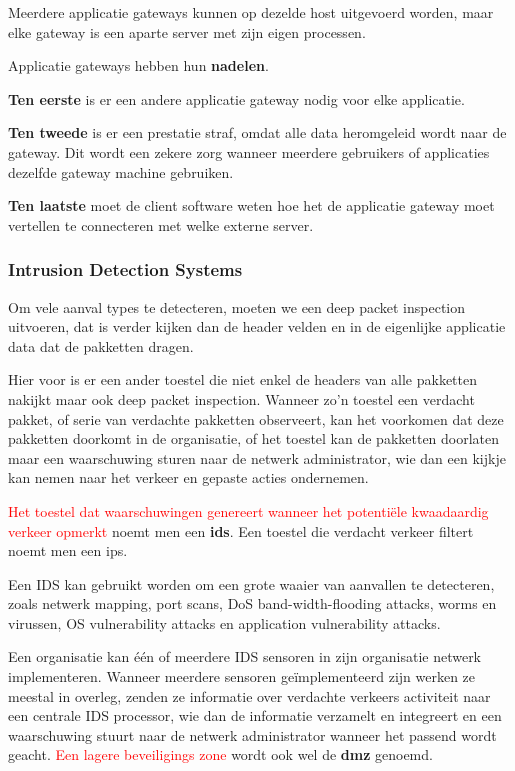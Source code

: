 \noindent Meerdere applicatie gateways kunnen op dezelde host uitgevoerd worden, maar elke gateway is een aparte server met zijn eigen processen.

\noindent Applicatie gateways hebben hun \textbf{nadelen}.

\noindent \textbf{Ten eerste} is er een andere applicatie gateway nodig voor elke applicatie. 

\noindent \textbf{Ten tweede} is er een prestatie straf, omdat alle data heromgeleid wordt naar de gateway. Dit wordt een zekere zorg wanneer meerdere gebruikers of applicaties dezelfde gateway machine gebruiken. 

\noindent \textbf{Ten laatste} moet de client software weten hoe het de applicatie gateway moet vertellen te connecteren met welke externe server.

\newpage

\subsubsection{Intrusion Detection Systems}

\noindent Om vele aanval types te detecteren, moeten we een deep packet inspection uitvoeren, dat is verder kijken dan de header velden en in de eigenlijke applicatie data dat de pakketten dragen.

\noindent Hier voor is er een ander toestel die niet enkel de headers van alle pakketten nakijkt maar ook deep packet inspection. Wanneer zo’n toestel een verdacht pakket, of serie van verdachte pakketten observeert, kan het voorkomen dat deze pakketten doorkomt in de organisatie, of het toestel kan de pakketten doorlaten maar een waarschuwing sturen naar de netwerk administrator, wie dan een kijkje kan nemen naar het verkeer en gepaste acties ondernemen.

\noindent\textcolor{red}{ Het toestel dat waarschuwingen genereert wanneer het potentiële kwaadaardig verkeer opmerkt} noemt men een \textbf{\acrfull{ids}}. Een toestel die verdacht verkeer filtert noemt men een \acrfull{ips}.

\noindent Een IDS kan gebruikt worden om een grote waaier van aanvallen te detecteren, zoals netwerk mapping, port scans, DoS band-width-flooding attacks, worms en virussen, OS vulnerability attacks en application vulnerability attacks.

\noindent Een organisatie kan één of meerdere IDS sensoren in zijn organisatie netwerk implementeren. Wanneer meerdere sensoren geïmplementeerd zijn werken ze meestal in overleg, zenden ze informatie over verdachte verkeers activiteit naar een centrale IDS processor, wie dan de informatie verzamelt en integreert en een waarschuwing stuurt naar de netwerk administrator wanneer het passend wordt geacht. \noindent\textcolor{red}{Een lagere beveiligings zone} wordt ook wel de \textbf{\acrfull{dmz}} genoemd.

